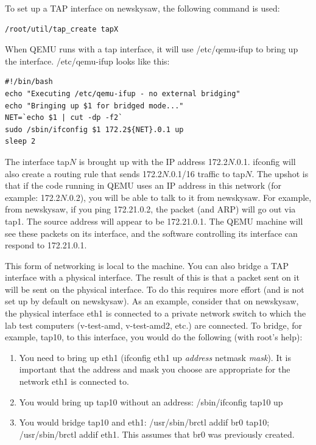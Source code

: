 \documentclass[11pt]{article}
\begin{document}
To set up a TAP interface on newskysaw, the following command is used:
\begin{verbatim}
/root/util/tap_create tapX
\end{verbatim}

When QEMU runs with a tap interface, it will use /etc/qemu-ifup to
bring up the interface.  /etc/qemu-ifup looks like this:

\begin{verbatim}
#!/bin/bash
echo "Executing /etc/qemu-ifup - no external bridging"
echo "Bringing up $1 for bridged mode..."
NET=`echo $1 | cut -dp -f2` 
sudo /sbin/ifconfig $1 172.2${NET}.0.1 up
sleep 2
\end{verbatim}

The interface tap$N$ is brought up with the IP address 172.2$N$.0.1.
ifconfig will also create a routing rule that sends 172.2$N$.0.1/16
traffic to tap$N$.  The upshot is that if the code running in QEMU
uses an IP address in this network (for example: 172.2$N$.0.2), you
will be able to talk to it from newskysaw.  For example, from
newskysaw, if you ping 172.21.0.2, the packet (and ARP) will go out via
tap1.  The source address will appear to be 172.21.0.1.  The QEMU
machine will see these packets on its interface, and the software
controlling its interface can respond to 172.21.0.1.  

This form of networking is local to the machine.  You can also bridge
a TAP interface with a physical interface.  The result of this is that
a packet sent on it will be sent on the physical interface.  To do
this requires more effort (and is not set up by default on newskysaw).
As an example, consider that on newskysaw, the physical interface eth1
is connected to a private network switch to which the lab test
computers (v-test-amd, v-test-amd2, etc.) are connected.  To bridge,
for example, tap10, to this interface, you would do the following
(with root's help):
\begin{enumerate}
\item You need to bring up eth1 (ifconfig eth1 up {\em address}
netmask {\em mask}).  It is important that the address and mask you
choose are appropriate for the network eth1 is connected to.
\item You would bring up tap10 without an address:  /sbin/ifconfig
tap10 up
\item You would bridge tap10 and eth1:  /usr/sbin/brctl addif br0
tap10; /usr/sbin/brctl addif eth1.  This assumes that br0 was
previously created. 
\end{enumerate}
\end{document}
